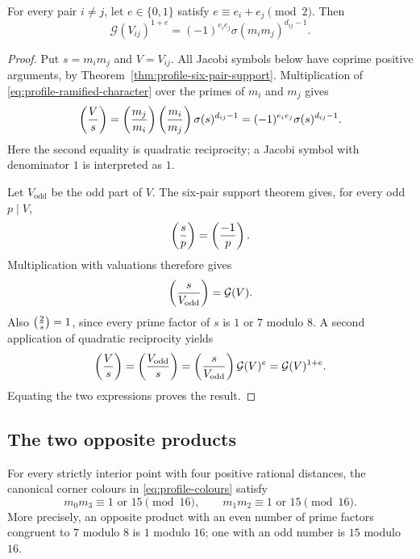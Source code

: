 \begin{theorem}\label{thm:profile-master}
For every pair $i\ne j$, let $e\in\{0,1\}$ satisfy
$e\equiv e_i+e_j\pmod2$.  Then
\begin{equation}\label{eq:profile-master}
 \mathcal G(V_{ij})^{1+e}
   =(-1)^{e_ie_j}\sigma(m_im_j)^{d_{ij}-1}.
\end{equation}
\end{theorem}

\begin{proof}
Put $s=m_im_j$ and $V=V_{ij}$.  All Jacobi symbols below have coprime
positive arguments, by Theorem~\ref{thm:profile-six-pair-support}.
Multiplication of \eqref{eq:profile-ramified-character} over the primes
of $m_i$ and $m_j$ gives
\[
 \left(\frac{V}{s}\right)
  =\left(\frac{m_j}{m_i}\right)\left(\frac{m_i}{m_j}\right)\sigma(s)^{d_{ij}-1}
  =(-1)^{e_ie_j}\sigma(s)^{d_{ij}-1}.
\]
Here the second equality is quadratic reciprocity; a Jacobi symbol with
denominator $1$ is interpreted as $1$.

Let $V_{\mathrm{odd}}$ be the odd part of $V$.  The six-pair support
theorem gives, for every odd $p\mid V$,
\[
 \left(\frac{s}{p}\right)=\left(\frac{-1}{p}\right).
\]
Multiplication with valuations therefore gives
\[
 \left(\frac{s}{V_{\mathrm{odd}}}\right)=\mathcal G(V).
\]
Also $\left(\frac{2}{s}\right)=1$, since every prime factor of $s$ is $1$ or $7$
modulo $8$.  A second application of quadratic reciprocity yields
\[
 \left(\frac{V}{s}\right)
 =\left(\frac{V_{\mathrm{odd}}}{s}\right)
 =\left(\frac{s}{V_{\mathrm{odd}}}\right)\mathcal G(V)^e
 =\mathcal G(V)^{1+e}.
\]
Equating the two expressions proves the result.
\end{proof}

\subsection{The two opposite products}

\begin{theorem}\label{thm:profile-main}
For every strictly interior point with four positive rational distances,
the canonical corner colours in \eqref{eq:profile-colours} satisfy
\begin{equation}\label{eq:profile-main}
 \boxed{\quad m_0m_3\equiv1\text{ or }15\pmod{16},\qquad
               m_1m_2\equiv1\text{ or }15\pmod{16}.\quad}
\end{equation}
More precisely, an opposite product with an even number of prime factors
congruent to $7$ modulo $8$ is $1$ modulo $16$; one with an odd number
is $15$ modulo $16$.
\end{theorem}

